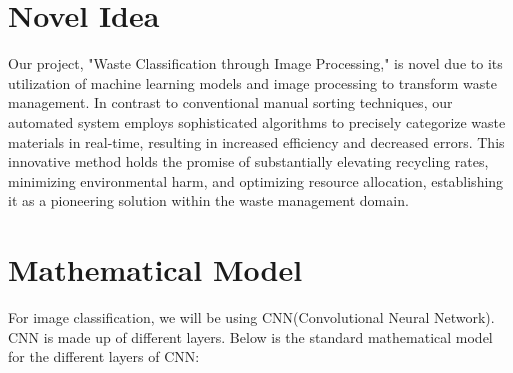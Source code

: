 \documentclass{article}
\begin{document}
\section{Novel Idea}
Our project, "Waste Classification through Image Processing," is novel due to its utilization of machine learning models and image processing to transform waste management. In contrast to conventional manual sorting techniques, our automated system employs sophisticated algorithms to precisely categorize waste materials in real-time, resulting in increased efficiency and decreased errors. This innovative method holds the promise of substantially elevating recycling rates, minimizing environmental harm, and optimizing resource allocation, establishing it as a pioneering solution within the waste management domain.

\section{Mathematical Model}
For image classification, we will be using CNN(Convolutional Neural Network). CNN is made up of different layers. Below is the standard mathematical model for the different layers of CNN:
\end{document}
